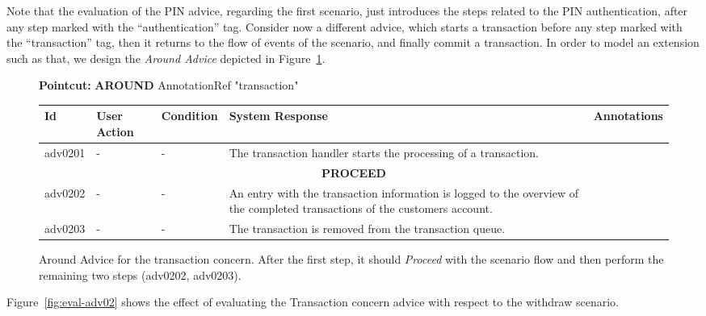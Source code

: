 \documentclass{article}
\begin{document}
\newpage

Note that the evaluation of the PIN advice, regarding the first scenario, just introduces 
the steps related to the PIN authentication, after any step marked with the ``authentication'' 
tag. Consider now a different advice, which starts a transaction before any step marked with 
the ``transaction'' tag, then it returns to the flow of events of the scenario, and finally commit a transaction. 
In order to model an extension such as that, we design the \emph{Around Advice} depicted in  
Figure~\ref{fig:adv02}.

\begin{figure}[htb]
 
\begin{tabbing} {\bf Pointcut:} \= {\bf AROUND} AnnotationRef "transaction"\\ \end{tabbing} \begin{tabular}{|p{0.4in}|p{1.2in}|p{1.2in}|p{1.2in}|p{1.2in}|} \hline Id & User Action & Condition & System Response & Annotations \\ \hline adv0201 & - & - & The transaction handler starts the processing of a transaction. & \\ \hline \multicolumn{5}{c}{{\bf PROCEED}} \\ \hline adv0202 & - & - & An entry with the transaction information is logged to the overview of the completed transactions of the customers account. & \\ \hline adv0203 & - & - & The transaction is removed from the transaction queue. & \\ \hline \end{tabular}
 \caption{Around Advice for the transaction concern. After the first step, it should \emph{Proceed} with the scenario flow and 
  then perform the remaining two steps (adv0202, adv0203).}
 \label{fig:adv02}
\end{figure}

\newpage

Figure~\ref{fig:eval-adv02} shows the effect of evaluating the Transaction concern advice with respect to the 
withdraw scenario. 
\end{document}
